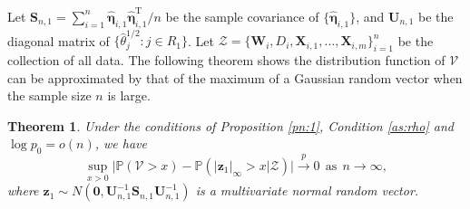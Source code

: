 \documentclass[12pt]{article}
\def\T{{ \mathrm{\scriptscriptstyle T} }}
\newtheorem{theorem}{Theorem}
\theoremstyle{definition}
\newcommand{\bG}{{\mathbf G}}
\newcommand{\bS}{{\mathbf S}}
\newcommand{\bU}{{\mathbf U}}
\newcommand{\bW}{{\mathbf W}}
\newcommand{\bX}{{\mathbf X}}
\newcommand{\bz}{{\mathbf z}}
\newcommand{\bfeta}  {\boldsymbol{\eta}}
\newcommand{\bzero}{{\mathbf 0}}
\begin{document}
Let $\bS_{n, 1} = \sum_{i = 1}^{n} \hat{\bfeta}_{i, 1} \hat{\bfeta}_{i, 1}^{\T} / n$ be the sample covariance of $\{\hat{\bfeta}_{i, 1}\}$, 
and $\bU_{n, 1}$ be the diagonal matrix of $\{\hat{\theta}_{j}^{1/2}: j \in R_1\}$.
Let $\mathcal{Z} = \{\bW_i, D_i, \bX_{i, 1}, \ldots, \bX_{i, m} \}_{i =1}^{n}$ be the collection of all data.
The following theorem shows the distribution function of $\mathcal{V}$ can be approximated by that of the maximum of a Gaussian random vector when the sample size $n$ is large.

\begin{theorem}\label{pn:2}
Under the conditions of Proposition \ref{pn:1}, Condition \ref{as:rho} and $\log p_0 = o(n)$, 
we have
\[
\sup_{x>0}\big|\mathbb{P}(\mathcal{V} > x ) - \mathbb{P}(|\bz_{1}|_{\infty} > x| \mathcal{Z} )\big|\xrightarrow{p}0~~\textrm{as}~~n\rightarrow\infty,
\]
where $\bz_{1} \sim N(\bzero, \bU_{n, 1}^{-1} \bS_{n, 1} \bU_{n, 1}^{-1})$
is a multivariate normal random vector. 
\end{theorem}
\end{document}
